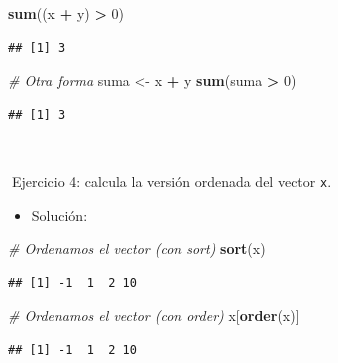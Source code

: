 \documentclass[11pt,]{book}
\newenvironment{Shaded}{\begin{snugshade}}{\end{snugshade}}
\newcommand{\CommentTok}[1]{\textcolor[rgb]{0.37,0.37,0.37}{\textit{#1}}}
\newcommand{\DecValTok}[1]{\textcolor[rgb]{0.06,0.06,0.06}{#1}}
\newcommand{\KeywordTok}[1]{\textcolor[rgb]{0.27,0.27,0.27}{\textbf{#1}}}
\newcommand{\NormalTok}[1]{#1}
\newcommand{\OperatorTok}[1]{\textcolor[rgb]{0.43,0.43,0.43}{\textbf{#1}}}
\newcommand{\StringTok}[1]{\textcolor[rgb]{0.5,0.5,0.5}{#1}}
\providecommand{\tightlist}{%
  \setlength{\itemsep}{0pt}\setlength{\parskip}{0pt}}
\begin{document}
\begin{Shaded}
\begin{Highlighting}[]
\KeywordTok{sum}\NormalTok{((x }\OperatorTok{+}\StringTok{ }\NormalTok{y) }\OperatorTok{>}\StringTok{ }\DecValTok{0}\NormalTok{)}
\end{Highlighting}
\end{Shaded}

\begin{verbatim}
## [1] 3
\end{verbatim}

\begin{Shaded}
\begin{Highlighting}[]
\CommentTok{# Otra forma}
\NormalTok{suma <-}\StringTok{ }\NormalTok{x }\OperatorTok{+}\StringTok{ }\NormalTok{y}
\KeywordTok{sum}\NormalTok{(suma }\OperatorTok{>}\StringTok{ }\DecValTok{0}\NormalTok{)}
\end{Highlighting}
\end{Shaded}

\begin{verbatim}
## [1] 3
\end{verbatim}

~

📝Ejercicio 4: calcula la versión ordenada del vector \texttt{x}.

\begin{itemize}
\tightlist
\item
  Solución:
\end{itemize}

\begin{Shaded}
\begin{Highlighting}[]
\CommentTok{# Ordenamos el vector (con sort)}
\KeywordTok{sort}\NormalTok{(x)}
\end{Highlighting}
\end{Shaded}

\begin{verbatim}
## [1] -1  1  2 10
\end{verbatim}

\begin{Shaded}
\begin{Highlighting}[]
\CommentTok{# Ordenamos el vector  (con order)}
\NormalTok{x[}\KeywordTok{order}\NormalTok{(x)]}
\end{Highlighting}
\end{Shaded}

\begin{verbatim}
## [1] -1  1  2 10
\end{verbatim}
\end{document}
